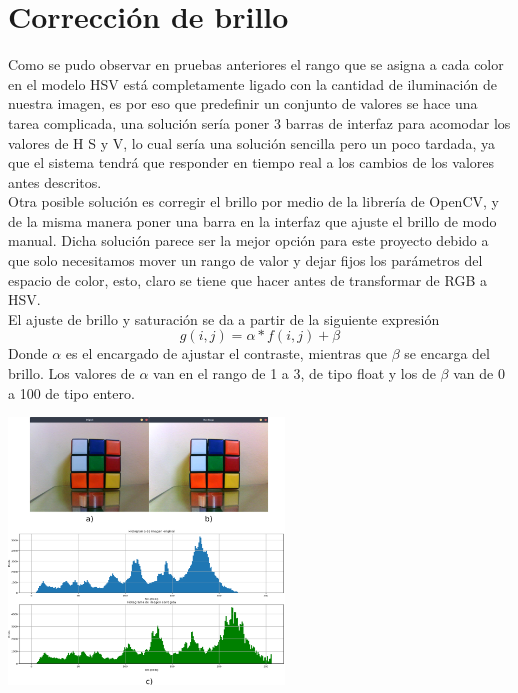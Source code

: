 \section{Corrección de brillo}
Como se pudo observar en pruebas anteriores el rango que se asigna a cada color en el modelo HSV está
completamente ligado con la cantidad de iluminación de nuestra imagen, es por eso que predefinir
un conjunto de valores se hace una tarea complicada, una solución sería poner 3 barras de interfaz
para acomodar los valores de H S y V, lo cual sería una solución sencilla pero un poco tardada, ya que
el sistema tendrá que responder en tiempo real a los cambios de los valores antes descritos.\\
Otra posible solución es corregir el brillo por medio de la librería de OpenCV,
y de la misma manera poner una barra en la interfaz que ajuste el brillo de modo manual. Dicha solución
parece ser la mejor opción para este proyecto debido a que solo necesitamos mover un rango de valor y dejar
fijos los parámetros del espacio de color, esto, claro se tiene que hacer antes de transformar de RGB
a HSV.\\
El ajuste de brillo y saturación se da a partir de la siguiente expresión
\begin{equation}
	g(i,j) = \alpha * f(i,j) + \beta
\end{equation}
Donde $\alpha$ es el encargado de ajustar el contraste, mientras que $\beta$ se encarga del brillo.
Los valores de $\alpha$ van en el rango de 1 a 3, de tipo float y los de $\beta$ van de 0 a 100 de tipo entero.
\begin{center}
	\includegraphics[width=0.55\textwidth]{Contenido/Cuerpo/Capitulo4/Fig19.eps}
	\label{Fig9}
\end{center}
